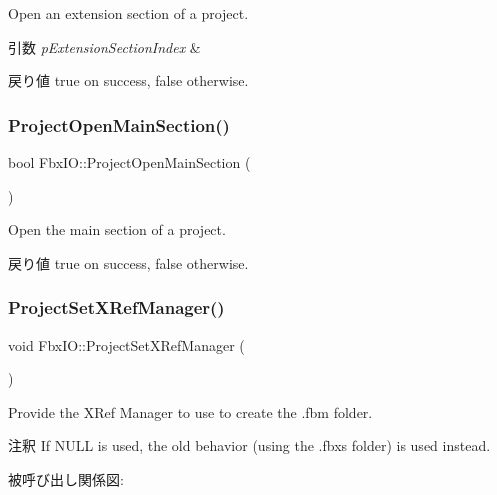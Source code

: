 Open an extension section of a project. 
\begin{DoxyParams}{引数}
{\em p\+Extension\+Section\+Index} & \\
\hline
\end{DoxyParams}
\begin{DoxyReturn}{戻り値}
{\ttfamily true} on success, {\ttfamily false} otherwise. 
\end{DoxyReturn}
\mbox{\label{class_fbx_i_o_aad4f715a886ebfc218f54b1387804190}} 
\subsubsection{\texorpdfstring{Project\+Open\+Main\+Section()}{ProjectOpenMainSection()}}
{\footnotesize\ttfamily bool Fbx\+I\+O\+::\+Project\+Open\+Main\+Section (\begin{DoxyParamCaption}{ }\end{DoxyParamCaption})}

Open the main section of a project. \begin{DoxyReturn}{戻り値}
{\ttfamily true} on success, {\ttfamily false} otherwise. 
\end{DoxyReturn}
\mbox{\label{class_fbx_i_o_a7064f301bce688c750ed1427e5babc61}} 
\subsubsection{\texorpdfstring{Project\+Set\+X\+Ref\+Manager()}{ProjectSetXRefManager()}}
{\footnotesize\ttfamily void Fbx\+I\+O\+::\+Project\+Set\+X\+Ref\+Manager (\begin{DoxyParamCaption}\item[{const \hyperlink{class_fbx_x_ref_manager}{Fbx\+X\+Ref\+Manager} $\ast$}]{ }\end{DoxyParamCaption})}

Provide the X\+Ref Manager to use to create the .fbm folder. \begin{DoxyRemark}{注釈}
If N\+U\+LL is used, the old behavior (using the .fbx\textquotesingle{}s folder) is used instead. 
\end{DoxyRemark}
被呼び出し関係図\+:
\mbox{\label{class_fbx_i_o_a6efe694fd5980f3990d6146f830106a3}} 
